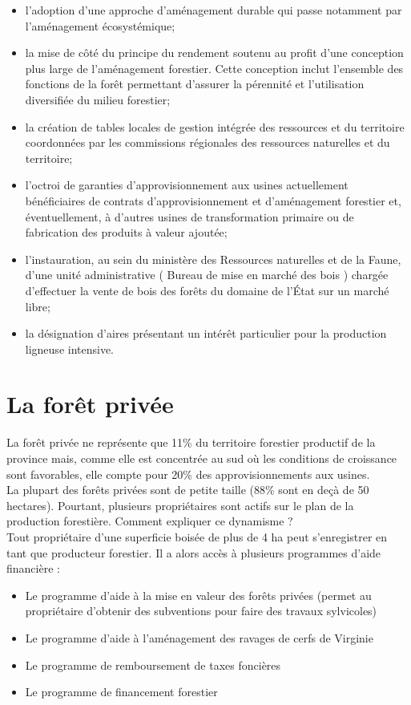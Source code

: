 \begin{itemize}
\item l'adoption d'une approche d'aménagement durable qui passe notamment par l'aménagement écosystémique;
\item la mise de côté du principe du rendement soutenu au profit d'une conception plus large de l'aménagement forestier. Cette conception inclut l'ensemble des fonctions de la forêt permettant d'assurer la pérennité et l'utilisation diversifiée du milieu forestier;
\item la création de tables locales de gestion intégrée des ressources et du territoire coordonnées par les commissions régionales des ressources naturelles et du territoire;
\item l'octroi de garanties d'approvisionnement aux usines actuellement bénéficiaires de contrats d'approvisionnement et d'aménagement forestier et, éventuellement, à d'autres usines de transformation primaire ou de fabrication des produits à valeur ajoutée;
\item l'instauration, au sein du ministère des Ressources naturelles et de la Faune, d'une unité administrative ( \og Bureau de mise en marché des bois  \fg) chargée d'effectuer la vente de bois des forêts du domaine de l'État sur un marché libre; 
\item la désignation d'aires présentant un intérêt particulier pour la production ligneuse intensive.
\end{itemize}

\section{La forêt privée}

La forêt privée ne représente que 11\% du territoire forestier productif de la province mais, comme elle est concentrée au sud où les conditions de croissance sont favorables, elle compte pour 20\% des approvisionnements aux usines.
\\

La plupart des forêts privées sont de petite taille (88\% sont en deçà de 50 hectares). Pourtant, plusieurs propriétaires sont actifs sur le plan de la production forestière. Comment expliquer ce dynamisme ?
\\

Tout propriétaire d'une superficie boisée de plus de 4 ha peut s'enregistrer en tant que producteur forestier. Il a alors accès à plusieurs programmes d'aide financière :

\begin{itemize}
\item Le programme d'aide à la mise en valeur des forêts privées  (permet au propriétaire d'obtenir des subventions pour faire des travaux sylvicoles)
\item Le programme d'aide à l'aménagement des ravages de cerfs de Virginie 
\item Le programme de remboursement de taxes foncières 
\item Le programme de financement forestier
\end{itemize}

